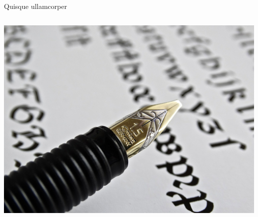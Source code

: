 \documentclass[aspectratio=169]{beamer}
\begin{document}

\begin{frame}{Quisque ullamcorper}%
	\begin{columns}%
			\setlength{\parskip}{1ex}%
			\justifying%
			\lipsum[4]
			\includegraphics[width=\textwidth]{fountain-pen}
	\end{columns}%
\end{frame}

\end{document}
